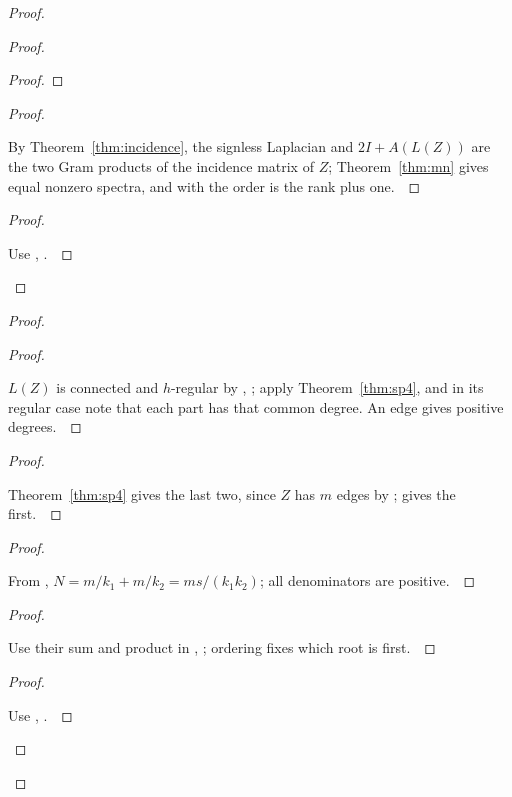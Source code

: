 \documentclass[11pt]{amsart}
\let\qed\relax
\theoremstyle{definition}
\begin{document}
\begin{proof}
\begin{proof}
\begin{proof}
\end{proof}
\begin{proof}
\pf\ \raggedright By Theorem~\ref{thm:incidence}, the signless Laplacian and $2I+A(L(Z))$ are the two Gram products of the incidence matrix of $Z$; Theorem~\ref{thm:mn} gives equal nonzero spectra, and with  the order is the rank plus one.~\qed
\end{proof}
\qedstep
\begin{proof}
\pf\ \raggedright Use , .~\qed
\end{proof}
\end{proof}
\begin{proof}
\begin{proof}
\pf\ \raggedright $L(Z)$ is connected and $h$-regular by , ; apply Theorem~\ref{thm:sp4}, and in its regular case note that each part has that common degree. An edge gives positive degrees.~\qed
\end{proof}
\begin{proof}
\pf\ \raggedright Theorem~\ref{thm:sp4} gives the last two, since $Z$ has $m$ edges by ;  gives the first.~\qed
\end{proof}
\begin{proof}
\pf\ \raggedright From , $N=m/k_1+m/k_2=ms/(k_1k_2)$; all denominators are positive.~\qed
\end{proof}
\begin{proof}
\pf\ \raggedright Use their sum and product in , ; ordering fixes which root is first.~\qed
\end{proof}
\qedstep
\begin{proof}
\pf\ \raggedright Use , .~\qed
\end{proof}
\end{proof}

\end{proof}
\end{document}
